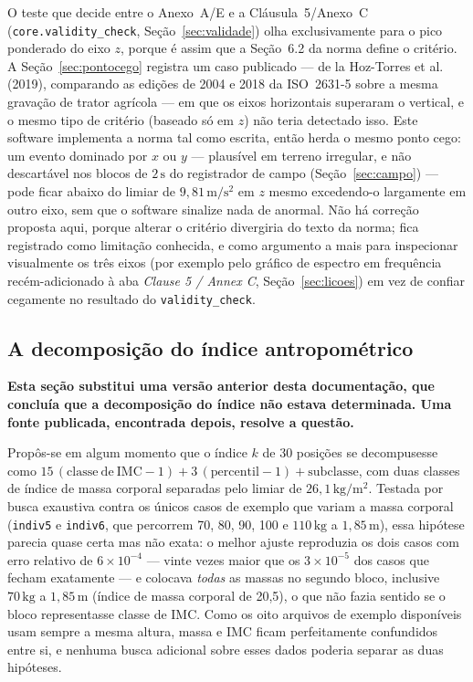 \documentclass[11pt,a4paper]{article}
\newcommand{\code}[1]{\texttt{\small #1}}
\newcommand{\unit}[2]{\ensuremath{#1\,\mathrm{#2}}}
\begin{document}
O teste que decide entre o Anexo~A/E e a Cláusula~5/Anexo~C
(\code{core.validity\_check}, Seção~\ref{sec:validade}) olha exclusivamente
para o pico ponderado do eixo $z$, porque é assim que a Seção~6.2 da norma
define o critério. A Seção~\ref{sec:pontocego} registra um caso publicado --- de
la Hoz-Torres et al. (2019), comparando as edições de 2004 e 2018 da
ISO~2631-5 sobre a mesma gravação de trator agrícola --- em que os eixos
horizontais superaram o vertical, e o mesmo tipo de critério (baseado só em
$z$) não teria detectado isso. Este software implementa a norma tal como
escrita, então herda o mesmo ponto cego: um evento dominado por $x$ ou $y$ ---
plausível em terreno irregular, e não descartável nos blocos de \unit{2}{s} do
registrador de campo (Seção~\ref{sec:campo}) --- pode ficar abaixo do limiar de
\unit{9{,}81}{m/s^2} em $z$ mesmo excedendo-o largamente em outro eixo, sem que
o software sinalize nada de anormal. Não há correção proposta aqui, porque
alterar o critério divergiria do texto da norma; fica registrado como
limitação conhecida, e como argumento a mais para inspecionar visualmente os
três eixos (por exemplo pelo gráfico de espectro em frequência recém-adicionado
à aba \emph{Clause 5 / Annex C}, Seção~\ref{sec:licoes}) em vez de confiar cegamente
no resultado do \code{validity\_check}.

\subsection{A decomposição do índice antropométrico}
\label{sec:indice}

\textbf{Esta seção substitui uma versão anterior desta documentação, que
concluía que a decomposição do índice não estava determinada. Uma fonte
publicada, encontrada depois, resolve a questão.}

Propôs-se em algum momento que o índice $k$ de 30 posições se decompusesse como
$15\,(\mathrm{classe\ de\ IMC} - 1) + 3\,(\mathrm{percentil} - 1) +
\mathrm{subclasse}$, com duas classes de índice de massa corporal separadas pelo
limiar de \unit{26{,}1}{kg/m^2}. Testada por busca exaustiva contra os únicos
casos de exemplo que variam a massa corporal (\code{indiv5} e \code{indiv6}, que
percorrem 70, 80, 90, 100 e \unit{110}{kg} a \unit{1{,}85}{m}), essa hipótese
parecia quase certa mas não exata: o melhor ajuste reproduzia os dois casos com
erro relativo de $6\times10^{-4}$ --- vinte vezes maior que os $3\times10^{-5}$
dos casos que fecham exatamente --- e colocava \emph{todas} as massas no
segundo bloco, inclusive \unit{70}{kg} a \unit{1{,}85}{m} (índice de massa
corporal de 20,5), o que não fazia sentido se o bloco representasse classe de
IMC. Como os oito arquivos de exemplo disponíveis usam sempre a mesma altura,
massa e IMC ficam perfeitamente confundidos entre si, e nenhuma busca adicional
sobre esses dados poderia separar as duas hipóteses.
\end{document}
